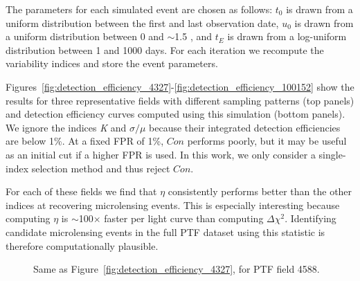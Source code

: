 \documentclass{emulateapj}
\begin{document}
The parameters for each simulated event are chosen as follows: $t_0$ is drawn from a uniform distribution between the first and last observation date, $u_0$ is drawn from a uniform distribution between 0 and $\sim$1.5 \citep[the impact parameter that causes a maximum deviation larger than $\sim$$5\sigma$ for a $R\sim17.5$ mag source; e.g.,][]{macho_detection_efficiency}, and $t_E$ is drawn from a log-uniform distribution between 1 and 1000 days. For each iteration we recompute the variability indices and store the event parameters. 

Figures~\ref{fig:detection_efficiency_4327}-\ref{fig:detection_efficiency_100152} show the results for three representative fields with different sampling patterns (top panels) and detection efficiency curves computed using this simulation (bottom panels). We ignore the indices \textit{K} and $\sigma/\mu$ because their integrated detection efficiencies are below 1\%. At a fixed FPR of 1\%, $Con$ performs poorly, but it may be useful as an initial cut if a higher FPR is used. In this work, we only consider a single-index selection method and thus reject $Con$. 

For each of these fields we find that $\eta$ consistently performs better than the other indices at recovering microlensing events. This is especially interesting because computing $\eta$ is $\sim$100$\times$ faster per light curve than computing $\Delta\chi^2$. Identifying candidate microlensing events in the full PTF dataset using this statistic is therefore computationally plausible.
	


\begin{figure}
\centering
	
\caption{Same as Figure~\ref{fig:detection_efficiency_4327}, for PTF field 4588.}\label{fig:detection_efficiency_4588}
\end{figure}
\end{document}
